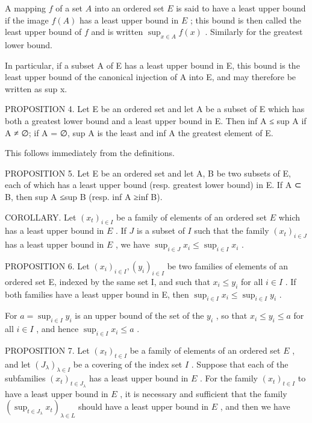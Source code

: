 A mapping \(f\) of a set \(A\) into an ordered set \(E\) is said to have a least upper bound if the image \(f(A)\) has a least upper bound in \(E\) ; this bound is then called the least upper bound of \(f\) and is written \(\sup_{x \in A} f(x)\) . Similarly for the greatest lower bound.

In particular, if a subset A of E has a least upper bound in E, this bound is the least upper bound of the canonical injection of A into E, and may therefore be written as sup x.

PROPOSITION 4. Let E be an ordered set and let A be a subset of E which has both a greatest lower bound and a least upper bound in E. Then inf A ≤ sup A if A ≠ ∅; if A = ∅, sup A is the least and inf A the greatest element of E.

This follows immediately from the definitions.

PROPOSITION 5. Let E be an ordered set and let A, B be two subsets of E, each of which has a least upper bound (resp. greatest lower bound) in E. If A ⊂ B, then sup A ≤sup B (resp. inf A ≥inf B).

COROLLARY. Let \((x_{t})_{i\in I}\) be a family of elements of an ordered set \(E\) which has a least upper bound in \(E\) . If \(J\) is a subset of \(I\) such that the family \((x_{t})_{i\in J}\) has a least upper bound in \(E\) , we have \(\sup_{i\in J}x_i\leqslant \sup_{i\in I}x_i\) .

PROPOSITION 6. Let \((x_{i})_{i\in I}, (y_{i})_{i\in I}\) be two families of elements of an ordered set E, indexed by the same set I, and such that \(x_{i} \leqslant y_{i}\) for all \(i\in I\) . If both families have a least upper bound in E, then \(\sup_{i\in I} x_{i} \leqslant \sup_{i\in I} y_{i}\) .

For \(a = \sup_{i \in I} y_i\) is an upper bound of the set of the \(y_i\) , so that \(x_i \leqslant y_i \leqslant a\) for all \(i \in I\) , and hence \(\sup_{i \in I} x_i \leqslant a\) .

PROPOSITION 7. Let \((x_{t})_{t\in I}\) be a family of elements of an ordered set \(E\) , and let \((J_{\lambda})_{\lambda \in I}\) be a covering of the index set \(I\) . Suppose that each of the subfamilies \((x_{t})_{t\in J_{\lambda}}\) has a least upper bound in \(E\) . For the family \((x_{t})_{t\in I}\) to have a least upper bound in \(E\) , it is necessary and sufficient that the family \(\left(\sup_{t\in J_{\lambda}}x_{t}\right)_{\lambda \in L}\) should have a least upper bound in \(E\) , and then we have

